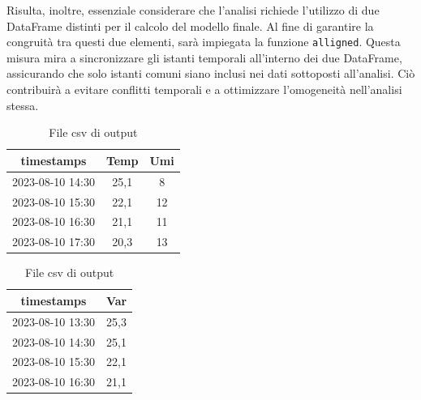 \documentclass{rapportECL}
\begin{document}
Risulta, inoltre, essenziale considerare che l'analisi richiede l'utilizzo di due DataFrame distinti per il calcolo del modello finale. 
Al fine di garantire la congruità tra questi due elementi, sarà impiegata la funzione \texttt{alligned}. Questa misura mira a sincronizzare 
gli istanti temporali all'interno dei due DataFrame, assicurando che solo istanti comuni siano inclusi nei dati sottoposti all'analisi. 
Ciò contribuirà a evitare conflitti temporali e a ottimizzare l'omogeneità nell'analisi stessa.

\begin{table}[htp]
  \begin{minipage}{0.45\textwidth} %
    \centering
    \begin{tabular}{|c|c|c|}

      \hline
      timestamps & Temp & Umi\\
      \hline
      2023-08-10 14:30 & 25,1 & 8\\
      \hline
      2023-08-10 15:30 & 22,1 & 12\\
      \hline
      2023-08-10 16:30 & 21,1 & 11\\
      \hline
      2023-08-10 17:30 & 20,3 & 13\\
      \hline
    
    \end{tabular}
    
    \caption{File csv di input}
  \end{minipage}
  \hfill %
  \begin{minipage}{0.45\textwidth} %
    \centering
    \begin{tabular}{|c|c|}

      \hline
      timestamps & Var\\
      \hline
      2023-08-10 13:30 & 25,3\\
      \hline
      2023-08-10 14:30 & 25,1\\
      \hline
      2023-08-10 15:30 & 22,1\\
      \hline
      2023-08-10 16:30 & 21,1\\
      \hline
      
    
    \end{tabular}
    
    \caption{File csv di output}
  \end{minipage}
\end{table}
\end{document}
